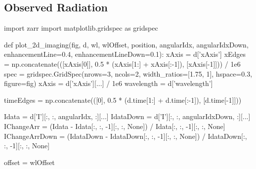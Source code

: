 \subsection{Observed Radiation}




\begin{pycode}[2DRT]
import zarr
import matplotlib.gridspec as gridspec


def plot_2d_imaging(fig, d, wl, wlOffset, position, angularIdx,
                    angularIdxDown, enhancementLine=0.4, enhancementLineDown=0.1):
    xAxis = d['xAxis']
    xEdges = np.concatenate(([xAxis[0]], 0.5 * (xAxis[1:] + xAxis[:-1]), [xAxis[-1]])) / 1e6
    spec = gridspec.GridSpec(nrows=3, ncols=2, width_ratios=[1.75, 1], hspace=0.3, figure=fig)
    xAxis = d['xAxis'][...] / 1e6
    wavelength = d['wavelength']

    timeEdges = np.concatenate(([0],
                                0.5 * (d.time[1:] + d.time[:-1]),
                                [d.time[-1]]))

    Idata = d['I'][:, :, angularIdx, :][...]
    IdataDown = d['I'][:, :, angularIdxDown, :][...]
    IChangeArr = (Idata - Idata[:, :, -1][:, :, None]) / Idata[:, :, -1][:, :, None]
    IChangeArrDown = (IdataDown - IdataDown[:, :, -1][:, :, None]) / IdataDown[:, :, -1][:, :, None]

    offset = wlOffset


\end{pycode}
